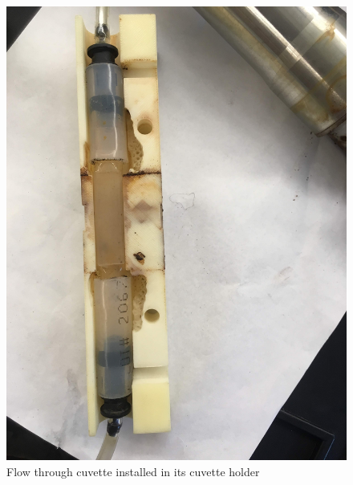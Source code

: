 \documentclass[]{book}
\begin{document}
\begin{figure}

{\centering \includegraphics[width=0.8\linewidth]{pictures/Cuvette2} 

}

\caption{Flow through cuvette installed in its cuvette holder}\label{fig:Cuvette2}
\end{figure}
\end{document}
